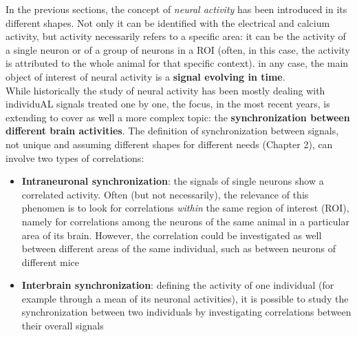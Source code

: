 \documentclass[a4paper]{article}
\begin{document}
In the previous sections, the concept of \textit{neural activity} has been introduced in its different shapes. Not only it can be identified with the electrical and calcium activity, but activity necessarily refers to a specific area: it can be the activity of a single neuron or of a group of neurons in a ROI (often, in this case, the activity is attributed to the whole animal for that specific context). in any case, the main object of interest of neural activity is a \textbf{signal evolving in time}.\\
While historically the study of neural activity has been mostly dealing with individuAL signals treated one by one, the focus, in the most recent years, is extending to cover as well a more complex topic: the \textbf{synchronization between different brain activities}. The definition of synchronization between signals, not unique and assuming different shapes for different needs (Chapter 2), can involve two types of correlations:

\begin{itemize}
	
	\item \textbf{Intraneuronal synchronization}: the signals of  single neurons show a correlated activity. Often (but not necessarily), the relevance of this phenomen is to look for correlations \textit{within} the same region of interest (ROI), namely for correlations among the neurons of the same animal in a particular area of its brain. However, the correlation could be investigated as well between different areas of the same individual, such as between neurons of different mice
	
	\item \textbf{Interbrain synchronization}: defining the activity of one individual (for example through a mean of its neuronal activities), it is possible to study the synchronization between two individuals by investigating correlations between their overall signals
	
\end{itemize}
\end{document}
